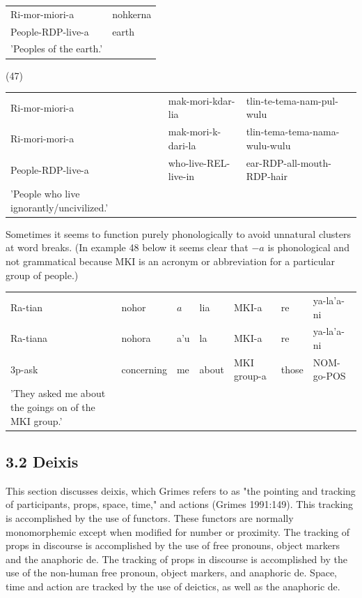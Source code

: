 \documentclass[10pt]{article}
\begin{document}
\begin{center}
\begin{tabular}{ll}
Ri-mor-miori-a & nohkerna \\
People-RDP-live-a & earth \\
'Peoples of the earth.' &  \\
\end{tabular}
\end{center}

(47)

\begin{center}
\begin{tabular}{lll}
Ri-mor-miori-a & mak-mori-kdar-lia & tlin-te-tema-nam-pul-wulu \\
Ri-mori-mori-a & mak-mori-k-dari-la & tlin-tema-tema-nama-wulu-wulu \\
People-RDP-live-a & who-live-REL-live-in & ear-RDP-all-mouth-RDP-hair \\
'People who live ignorantly/uncivilized.' &  &  \\
\end{tabular}
\end{center}

Sometimes it seems to function purely phonologically to avoid unnatural clusters at word breaks. (In example 48 below it seems clear that \(-a\) is phonological and not grammatical because MKI is an acronym or abbreviation for a particular group of people.)

\begin{center}
\begin{tabular}{lllllll}
Ra-tian & nohor & \(a\) & lia & MKI-a & re & ya-la'a-ni \\
Ra-tiana & nohora & a'u & la & MKI-a & re & ya-la'a-ni \\
3p-ask & concerning & me & about & MKI group-a & those & NOM-go-POS \\
'They asked me about the goings on of the MKI group.' &  &  &  &  &  &  \\
\end{tabular}
\end{center}

\subsection*{3.2 Deixis}
This section discusses deixis, which Grimes refers to as "the pointing and tracking of participants, props, space, time," and actions (Grimes 1991:149). This tracking is accomplished by the use of functors. These functors are normally monomorphemic except when modified for number or proximity. The tracking of props in discourse is accomplished by the use of free pronouns, object markers and the anaphoric de. The tracking of props in discourse is accomplished by the use of the non-human free pronoun, object markers, and anaphoric de. Space, time and action are tracked by the use of deictics, as well as the anaphoric de.
\end{document}
